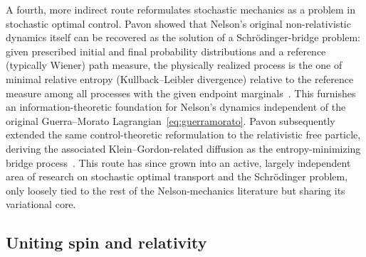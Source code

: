 \documentclass[11pt]{article}
\begin{document}
A fourth, more indirect route reformulates stochastic mechanics as a
problem in stochastic optimal control. Pavon showed that Nelson's original
non-relativistic dynamics itself can be recovered as the solution of a
Schr\"odinger-bridge problem: given prescribed initial and final
probability distributions and a reference (typically Wiener) path measure,
the physically realized process is the one of minimal relative entropy
(Kullback--Leibler divergence) relative to the reference measure among all
processes with the given endpoint marginals~\cite{pavon95}. This furnishes
an information-theoretic foundation for Nelson's dynamics independent of
the original Guerra--Morato Lagrangian~\eqref{eq:guerramorato}. Pavon
subsequently extended the same control-theoretic reformulation to the
relativistic free particle, deriving the associated Klein--Gordon-related
diffusion as the entropy-minimizing bridge process~\cite{pavon2001}. This
route has since grown into an active, largely independent area of research
on stochastic optimal transport and the Schr\"odinger problem, only loosely
tied to the rest of the Nelson-mechanics literature but sharing its
variational core.

\subsection{Uniting spin and relativity}\label{sec:relativity_spin}
\end{document}
